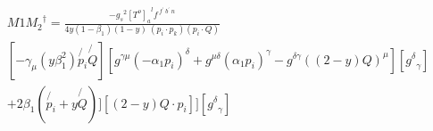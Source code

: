 \begin{equation}
\begin{split}
&M1{M_2}^{\dagger}=\frac{-{g_s}^2 {[T^{o}]_a}^{l} f^{\:f^{\prime}\: b^{\prime}\:n}}{4 y(1-\beta_1) (1-y)\:(p_i \cdot p_k)(p_i \cdot Q)}\\
&[-\gamma_{\mu}(y\beta_1^2)\not{p_i}\not{Q}][ g^{{{\gamma}}{{\mu}}}(-\alpha_1p_i)^{\delta}+g^{{{\mu}}{{\delta}}}(\alpha_1p_i )^{{\gamma}}-g^{\delta{{\gamma}}}((2-y)Q)^{{\mu}}][{g^{\delta}}_{\gamma}]\\
&+2\beta_1(\not{p_i}+y\not{Q})][(2-y)Q\cdot p_i]][{g^{\delta}}_{\gamma}]\\
\end{split}
\end{equation}














